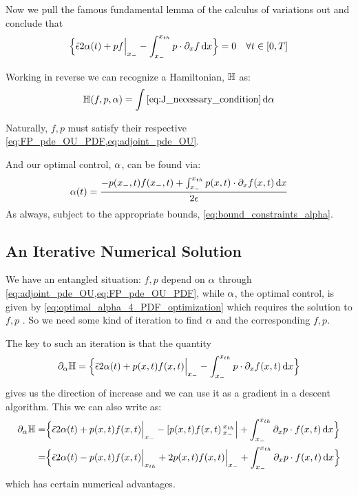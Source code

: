 \documentclass{article}
\begin{document}
Now we pull the famous fundamental lemma of the calculus of variations out and
conclude that
\begin{equation}
\Big\{
 \tilde{{\epsilon}}  2 {\alpha}(t)
+ p f \Big|_{ x_{-} }
- \int _{ x_{-} }^{ x_{th} } p \cdot {\partial}_x f \, \mathrm{d} x 
\Big\} = 0
\quad \forall t \in [0,T]
\label{eq:J_necessary_condition}
\end{equation}

Working in reverse we can recognize a Hamiltonian, ${ \mathbb{H}}$ as:
$$
\H(f,p,\a) =  \int \cref{eq:J_necessary_condition} \intd{\a} 
$$

Naturally, $f,p$ must satisfy their respective
\cref{eq:FP_pde_OU_PDF,eq:adjoint_pde_OU}.

And our optimal control, ${\alpha}$,  can be found via:
\begin{equation}
{\alpha} (t) = \frac { - p({ x_{-} },t) f({ x_{-} },t)
+ \int _{ x_{-} }^{ x_{th} } p(x,t) \cdot {\partial}_x f(x,t) \, \mathrm{d} x 
}{2{\epsilon}}
\label{eq:optimal_alpha_4_PDF_optimization}
\end{equation}
As always, subject to the appropriate bounds, \cref{eq:bound_constraints_alpha}.

\subsection{An Iterative Numerical Solution}
We have an entangled situation: $f,p$ depend on ${\alpha}$ through
\cref{eq:adjoint_pde_OU,eq:FP_pde_OU_PDF}, while ${\alpha}$, the optimal control, is
given by \cref{eq:optimal_alpha_4_PDF_optimization} which requires  the
solution to $f,p$ . So we need some kind of iteration to find ${\alpha}$ and the corresponding $f,p$.

The key to such an iteration is that the quantity 
$${\partial}_{\alpha} { \mathbb{H}} =  \Big\{
 \tilde{{\epsilon}}  2 {\alpha}(t)
+ p(x,t) f(x,t) \Big|_{ x_{-} }
- \int _{ x_{-} }^{ x_{th} } p \cdot {\partial}_x f(x,t) \, \mathrm{d} x 
\Big\}
$$
gives us the direction of increase
and we can use it as a gradient in a descent algorithm. 
This we can also write as:
\begin{align*}
{\partial}_{\alpha} { \mathbb{H}} =&  \Big\{
 \tilde{{\epsilon}}  2 {\alpha}(t)
+ p(x,t) f(x,t) \Big|_{ x_{-} }
- [p(x,t) f(x,t) \, _{ x_{-} }^{ x_{th} }\Big|
+ \int _{ x_{-} }^{ x_{th} } {\partial}_x p \cdot f(x,t) \, \mathrm{d} x 
\Big\}
\\
=&
 \Big\{
 \tilde{{\epsilon}}  2 {\alpha}(t)
- p(x,t) f(x,t)\Big|_{ x_{th} }
+ 2p(x,t) f(x,t) \Big|_{ x_{-} }
+ \int _{ x_{-} }^{ x_{th} } {\partial}_x p \cdot f(x,t) \, \mathrm{d} x 
\Big\}
\end{align*}
which has certain numerical advantages.
\end{document}
